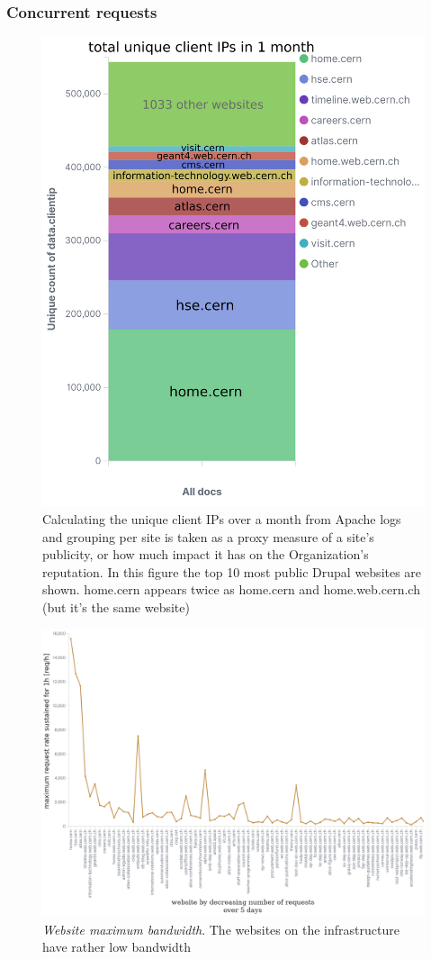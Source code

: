 \subsubsection*{Concurrent requests}

\begin{figure}
\centering
\includegraphics[width=.50\textwidth]{figures/drupal-top10-uniqClientIP.png}
\caption{Calculating the unique client IPs over a month from Apache logs and grouping per site
is taken as a proxy measure of a site's publicity, or how much impact it has on the Organization's reputation.
In this figure the top 10 most public Drupal websites are shown.
home.cern appears twice as home.cern and home.web.cern.ch (but it's the same website)
}
\label{fig-drp-top10-cip}
\end{figure}

\begin{figure}
    \centering
    \includegraphics[width=1.05\textwidth]{figures/website-bandwidth}
    \caption{\emph{Website maximum bandwidth}.
      The websites on the infrastructure have rather low bandwidth}
    \label{fig:my_label}
\end{figure}

